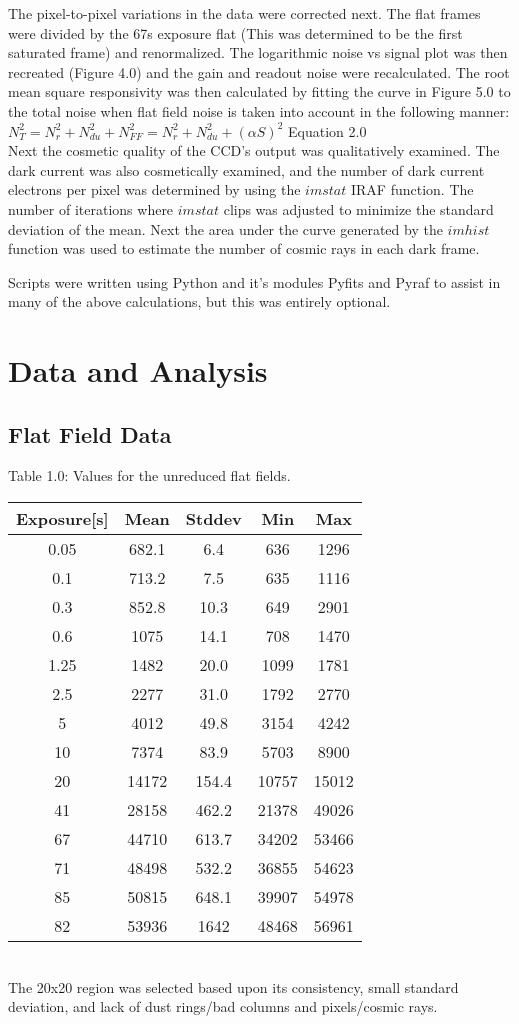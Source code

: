 \documentclass{article}
\begin{document}
The pixel-to-pixel variations in the data were corrected next. The flat frames were divided by the 67s exposure flat (This was determined to be the first saturated frame) and renormalized. The logarithmic noise vs signal plot was then recreated (Figure 4.0) and the gain and readout noise were recalculated. The root mean square responsivity was then calculated by fitting the curve in Figure 5.0 to the total noise when flat field noise is taken into account in the following manner:\\

$N_T^2=N_r^2+N_{du}^2+N_{FF}^2=N_r^2+N_{du}^2+(\alpha S)^2$ Equation 2.0\\

Next the cosmetic quality of the CCD's output was qualitatively examined. The dark current was also cosmetically examined, and the number of dark current electrons per pixel was determined by using the $imstat$ IRAF function. The number of iterations where $imstat$ clips was adjusted to minimize the standard deviation of the mean. Next the area under the curve generated by the $imhist$ function was used to estimate the number of cosmic rays in each dark frame.

Scripts were written using Python and it's modules Pyfits and Pyraf to assist in many of the above calculations, but this was entirely optional.
\section{Data and Analysis}
\subsection{Flat Field Data}
Table 1.0: Values for the unreduced flat fields.\\
\begin{tabular}{|c|c|c|c|c|}
\hline
Exposure[s] & Mean & Stddev & Min & Max \\
\hline
0.05 & 682.1 & 6.4 & 636 & 1296 \\
0.1 & 713.2 & 7.5 & 635 & 1116 \\
0.3 & 852.8 & 10.3 & 649 & 2901 \\
0.6 & 1075 & 14.1 & 708 & 1470 \\
1.25 & 1482 & 20.0 & 1099 & 1781 \\
2.5 & 2277 & 31.0 & 1792 & 2770 \\
5 & 4012 & 49.8 & 3154 & 4242 \\
10 & 7374 & 83.9 & 5703 & 8900 \\
20 & 14172 & 154.4 & 10757 & 15012 \\
41 & 28158 & 462.2 & 21378 & 49026 \\
67 & 44710 & 613.7 & 34202 & 53466 \\
71 & 48498 & 532.2 & 36855 & 54623 \\
85 & 50815 & 648.1 & 39907 & 54978 \\
82 & 53936 & 1642 & 48468 & 56961 \\
\hline
\end{tabular}\\
The 20x20 region was selected based upon its consistency, small standard deviation, and lack of dust rings/bad columns and pixels/cosmic rays.
\end{document}

